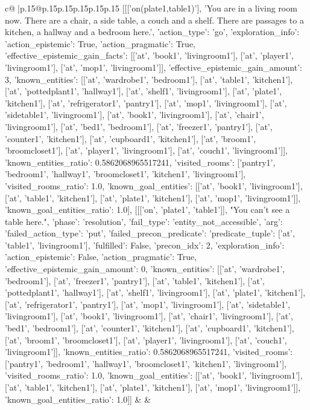 \documentclass{article}
\begin{document}
{\begin{supertabular}{c@{$\;$}|p{.15\linewidth}@{}p{.15\linewidth}p{.15\linewidth}p{.15\linewidth}p{.15\linewidth}p{.15\linewidth}}
{{{	 [[['on(plate1,table1)'], 'You are in a living room now. There are a chair, a side table, a couch and a shelf. There are passages to a kitchen, a hallway and a bedroom here.', {'action_type': 'go', 'exploration_info': {'action_epistemic': True, 'action_pragmatic': True, 'effective_epistemic_gain_facts': [['at', 'book1', 'livingroom1'], ['at', 'player1', 'livingroom1'], ['at', 'mop1', 'livingroom1']], 'effective_epistemic_gain_amount': 3, 'known_entities': [['at', 'wardrobe1', 'bedroom1'], ['at', 'table1', 'kitchen1'], ['at', 'pottedplant1', 'hallway1'], ['at', 'shelf1', 'livingroom1'], ['at', 'plate1', 'kitchen1'], ['at', 'refrigerator1', 'pantry1'], ['at', 'mop1', 'livingroom1'], ['at', 'sidetable1', 'livingroom1'], ['at', 'book1', 'livingroom1'], ['at', 'chair1', 'livingroom1'], ['at', 'bed1', 'bedroom1'], ['at', 'freezer1', 'pantry1'], ['at', 'counter1', 'kitchen1'], ['at', 'cupboard1', 'kitchen1'], ['at', 'broom1', 'broomcloset1'], ['at', 'player1', 'livingroom1'], ['at', 'couch1', 'livingroom1']], 'known_entities_ratio': 0.5862068965517241, 'visited_rooms': ['pantry1', 'bedroom1', 'hallway1', 'broomcloset1', 'kitchen1', 'livingroom1'], 'visited_rooms_ratio': 1.0, 'known_goal_entities': [['at', 'book1', 'livingroom1'], ['at', 'table1', 'kitchen1'], ['at', 'plate1', 'kitchen1'], ['at', 'mop1', 'livingroom1']], 'known_goal_entities_ratio': 1.0}}], [[['on', 'plate1', 'table1']], "You can't see a table here.", {'phase': 'resolution', 'fail_type': 'entity_not_accessible', 'arg': {'failed_action_type': 'put', 'failed_precon_predicate': {'predicate_tuple': ['at', 'table1', 'livingroom1'], 'fulfilled': False, 'precon_idx': 2}}, 'exploration_info': {'action_epistemic': False, 'action_pragmatic': True, 'effective_epistemic_gain_amount': 0, 'known_entities': [['at', 'wardrobe1', 'bedroom1'], ['at', 'freezer1', 'pantry1'], ['at', 'table1', 'kitchen1'], ['at', 'pottedplant1', 'hallway1'], ['at', 'shelf1', 'livingroom1'], ['at', 'plate1', 'kitchen1'], ['at', 'refrigerator1', 'pantry1'], ['at', 'mop1', 'livingroom1'], ['at', 'sidetable1', 'livingroom1'], ['at', 'book1', 'livingroom1'], ['at', 'chair1', 'livingroom1'], ['at', 'bed1', 'bedroom1'], ['at', 'counter1', 'kitchen1'], ['at', 'cupboard1', 'kitchen1'], ['at', 'broom1', 'broomcloset1'], ['at', 'player1', 'livingroom1'], ['at', 'couch1', 'livingroom1']], 'known_entities_ratio': 0.5862068965517241, 'visited_rooms': ['pantry1', 'bedroom1', 'hallway1', 'broomcloset1', 'kitchen1', 'livingroom1'], 'visited_rooms_ratio': 1.0, 'known_goal_entities': [['at', 'book1', 'livingroom1'], ['at', 'table1', 'kitchen1'], ['at', 'plate1', 'kitchen1'], ['at', 'mop1', 'livingroom1']], 'known_goal_entities_ratio': 1.0}}]] 
	  } 
	   } 
	   } 
	 & & \\ 
 


\end{supertabular}}
\end{document}
